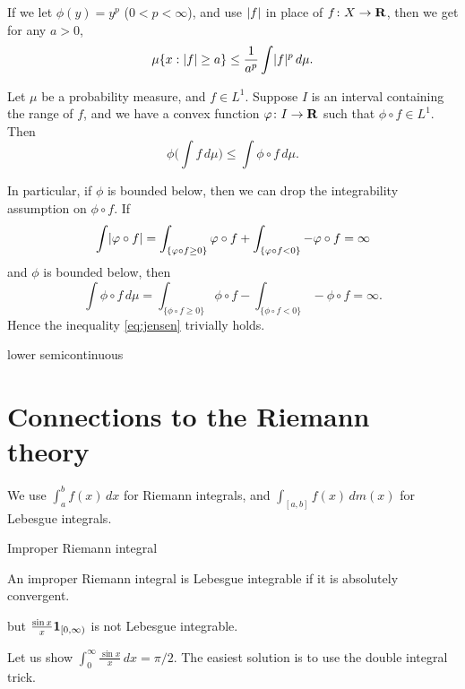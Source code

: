 If we let $\phi(y) = y^p$ ($0<p<\infty$), and use $\lvert f \rvert$ in place of $f\colon X\to \mathbf{R}$, then we get for any $a > 0$, \begin{equation}
    \mu\{x:\lvert f \rvert\geq a\} \leq \frac{1}{a^p}\int \lvert f \rvert^p\,d\mu. \label{eq:Lp-Markov}
\end{equation}

\begin{namedthm} \label{thm:Jensen-ms}
    Let $\mu$ be a probability measure, and $f\in L^1$. Suppose $I$ is an interval containing the range of $f$, and we have a convex function $\varphi\colon I\to \mathbf{R}$ such that $\phi\circ f\in L^1$. Then \begin{equation}
        \phi\biggl(\int f\,d\mu\biggr) \leq \int \phi\circ f \,d\mu. \label{eq:jensen}
    \end{equation}
\end{namedthm}

In particular, if $\phi$ is bounded below, then we can drop the integrability assumption on $\phi \circ f$. If \[\int \lvert \varphi \circ f \rvert= \int_{\{\varphi \circ f \geq 0\}} \varphi\circ f + \int_{\{\varphi \circ f < 0\}} -\varphi\circ f= \infty\] and $\phi$ is bounded below, then \[\int \phi \circ f\,d\mu = \int_{\{\phi \circ f \geq 0\}} \phi\circ f - \int_{\{\phi \circ f < 0\}} -\phi\circ f = \infty.\] Hence the inequality \eqref{eq:jensen} trivially holds.

lower semicontinuous

\section{Connections to the Riemann theory}

\begin{namedthm}
    
\end{namedthm}

We use $\int_a^b f(x)\,dx$ for Riemann integrals, and $\int_{[a,b]} f(x)\,dm(x)$ for Lebesgue integrals.

Improper Riemann integral 

An improper Riemann integral is Lebesgue integrable if it is absolutely convergent.

 but $\frac{\sin x}{x} \mathbf{1}_{[0,\infty)}$ is not Lebesgue integrable.

\begin{namedthm}
    Let us show $\int_{0}^\infty \frac{\sin x}{x}\,dx = \pi/2$. The easiest solution is to use the double integral trick.
\end{namedthm}

